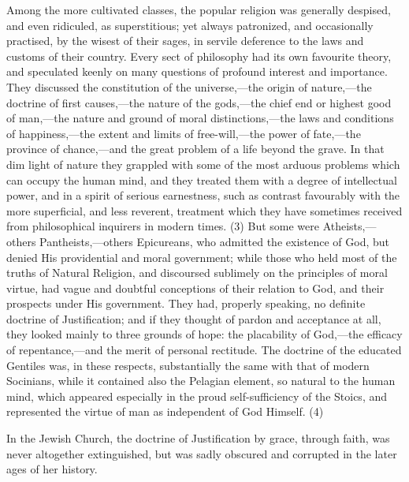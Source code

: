 \documentclass[
]{book}
\begin{document}
Among the more cultivated classes, the popular religion was generally despised, and even ridiculed, as superstitious; yet always patronized, and occasionally practised, by the wisest of their sages, in servile deference to the laws and customs of their country. Every sect of philosophy had its own favourite theory, and speculated keenly on many questions of profound interest and importance. They discussed the constitution of the universe,---the origin of nature,---the doctrine of first causes,---the nature of the gods,---the chief end or highest good of man,---the nature and ground of moral distinctions,---the laws and conditions of happiness,---the extent and limits of free-will,---the power of fate,---the province of chance,---and the great problem of a life beyond the grave. In that dim light of nature they grappled with some of the most arduous problems which can occupy the human mind, and they treated them with a degree of intellectual power, and in a spirit of serious earnestness, such as contrast favourably with the more superficial, and less reverent, treatment which they have sometimes received from philosophical inquirers in modern times. (3) But some were Atheists,---others Pantheists,---others Epicureans, who admitted the existence of God, but denied His providential and moral government; while those who held most of the truths of Natural Religion, and discoursed sublimely on the principles of moral virtue, had vague and doubtful conceptions of their relation to God, and their prospects under His government. They had, properly speaking, no definite doctrine of Justification; and if they thought of pardon and acceptance at all, they looked mainly to three grounds of hope: the placability of God,---the efficacy of repentance,---and the merit of personal rectitude. The doctrine of the educated Gentiles was, in these respects, substantially the same with that of modern Socinians, while it contained also the Pelagian element, so natural to the human mind, which appeared especially in the proud self-sufficiency of the Stoics, and represented the virtue of man as independent of God Himself. (4)

In the Jewish Church, the doctrine of Justification by grace, through faith, was never altogether extinguished, but was sadly obscured and corrupted in the later ages of her history.
\end{document}
